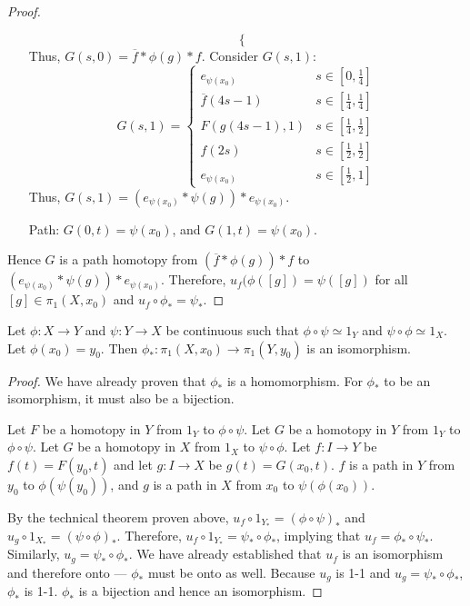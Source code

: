 \begin{proof}
\begin{itemize}
\[\begin{cases}
		\end{cases}
		\]
		Thus, $G(s,0)=\overline{f}*\phi(g)*f$. Consider $G(s,1)$:
		\[ G(s,1)= 
		\begin{cases}
			e_{\psi(x_0)} &s\in\left[0,\frac{1}{4}\right]\\
			\overline{f}(4s-1) &s\in\left[\frac{1}{4},\frac{1}{4}\right]\\
			F(g(4s-1),1) &s\in\left[\frac{1}{4},\frac{1}{2}\right]\\
			f(2s) &s\in\left[\frac{1}{2},\frac{1}{2}\right]\\
			e_{\psi(x_0)} &s\in\left[\frac{1}{2},1\right] 
		\end{cases}
		\]
		Thus, $G(s,1) = \left( e_{\psi(x_0)}*\psi(g)\right)*e_{\psi(x_0)}$. 
		\item[Path:] $G(0,t)=\psi(x_0)$, and $G(1,t)=\psi(x_0)$. 
	\end{itemize}
	
	Hence $G$ is a path homotopy from $\left(\overline{f}*\phi(g)\right)*f$ to $\left( e_{\psi(x_0)}*\psi(g)\right)*e_{\psi(x_0)}$. Therefore, $u_f(\phi([g])=\psi([g])$ for all $[g]\in\pi_1(X,x_0)$ and $u_f\circ\phi_*=\psi_*$. 
\end{proof}
\begin{corollary}
	Let $\phi:X\rightarrow Y$ and $\psi:Y\rightarrow X$ be continuous such that $\phi\circ\psi \simeq 1_Y$ and $\psi\circ\phi \simeq 1_X$. Let $\phi(x_0)=y_0$. Then $\phi_*:\pi_1(X,x_0)\rightarrow \pi_1(Y,y_0)$ is an isomorphism. 
\end{corollary}
\begin{proof}
	We have already proven that $\phi_*$ is a homomorphism. For $\phi_*$ to be an isomorphism, it must also be a bijection.
	
	Let $F$ be a homotopy in $Y$ from $1_Y$ to $\phi\circ\psi$. Let $G$ be a homotopy in $Y$ from $1_Y$ to $\phi\circ\psi$. Let $G$ be a homotopy in $X$ from $1_X$ to $\psi\circ\phi$. Let $f:I\rightarrow Y$ be $f(t)=F(y_0,t)$ and let $g:I\rightarrow X$ be $g(t)=G(x_0,t)$. $f$ is a path in $Y$ from $y_0$ to $\phi(\psi(y_0))$, and $g$ is a path in $X$ from $x_0$ to $\psi(\phi(x_0))$.
	
	By the technical theorem proven above, $u_f\circ 1_{Y_*}=(\phi\circ\psi)_*$ and $u_g\circ1_{X_*}=(\psi\circ\phi)_*$. Therefore, $u_f\circ1_{Y_*} = \psi_*\circ \phi_*$, implying that $u_f =\phi_*\circ\psi_*$. Similarly, $u_g = \psi_*\circ\phi_*$. We have already established that $u_f$ is an isomorphism and therefore onto --- $\phi_*$ must be onto as well. Because $u_g$ is 1-1 and $u_g=\psi_*\circ\phi_*$, $\phi_*$ is 1-1. $\phi_*$ is a bijection and hence an isomorphism. 
\end{proof}
